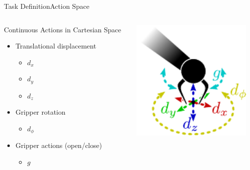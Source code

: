 \begin{frame}{Task Definition}{Action Space}
    \begin{columns}%
        \begin{column}{0.55\textwidth}%
            \begin{block}{Continuous Actions in Cartesian Space}
                \begin{itemize}
                    \item Translational displacement
                          \begin{itemize}
                              \item \(d_{x}\)
                              \item \(d_{y}\)
                              \item \(d_{z}\)
                          \end{itemize}
                    \item Gripper rotation
                          \begin{itemize}
                              \item \(d_{\phi}\)
                          \end{itemize}
                    \item Gripper actions (open/close)
                          \begin{itemize}
                              \item \(g\)
                          \end{itemize}
                \end{itemize}
            \end{block}
        \end{column}
        \begin{column}{0.45\textwidth}%
            \centering
            \includegraphics[height=6cm]{graphics/action_space.pdf}
        \end{column}
    \end{columns}
\end{frame}

